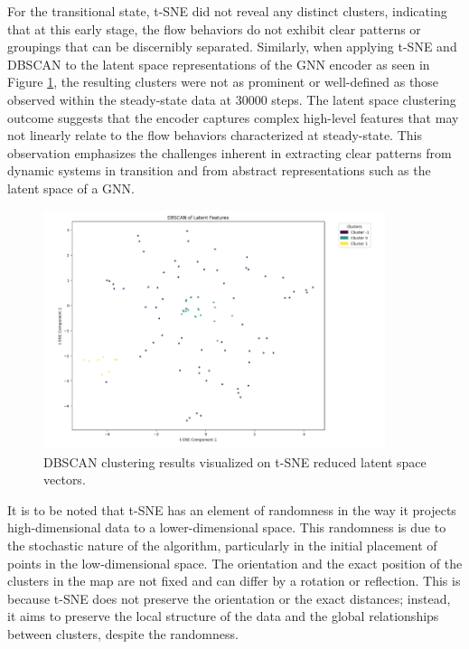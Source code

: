 For the transitional state, t-SNE did not reveal any distinct clusters, indicating that at this early stage, the flow behaviors do not exhibit clear patterns or groupings that can be discernibly separated. Similarly, when applying t-SNE and DBSCAN to the latent space representations of the GNN encoder as seen in Figure \ref{fig:dbscan_results2}, the resulting clusters were not as prominent or well-defined as those observed within the steady-state data at 30000 steps. The latent space clustering outcome suggests that the encoder captures complex high-level features that may not linearly relate to the flow behaviors characterized at steady-state. This observation emphasizes the challenges inherent in extracting clear patterns from dynamic systems in transition and from abstract representations such as the latent space of a GNN.
\begin{figure}[ht]
    \centering
    \includegraphics[width=10cm]{images/Clustering/cluster2.png}
    \caption{DBSCAN clustering results visualized on t-SNE reduced latent space vectors.}
    \label{fig:dbscan_results2}
    \end{figure}

It is to be noted that t-SNE has an element of randomness in the way it projects high-dimensional data to a lower-dimensional space. This randomness is due to the stochastic nature of the algorithm, particularly in the initial placement of points in the low-dimensional space. The orientation and the exact position of the clusters in the map are not fixed and can differ by a rotation or reflection. This is because t-SNE does not preserve the orientation or the exact distances; instead, it aims to preserve the local structure of the data and the global relationships between clusters, despite the randomness. 